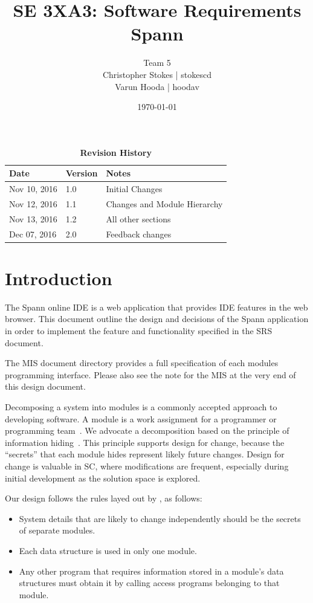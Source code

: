 \documentclass[12pt, titlepage]{article}
\title{SE 3XA3: Software Requirements\\Spann}
\author{Team 5
		\\ Christopher Stokes | stokescd
		\\ Varun Hooda | hoodav
}
\date{\today}
\begin{document}
\maketitle

\tableofcontents
\listoftables
\listoffigures

\begin{table}[bp]
\caption{\bf Revision History}
\begin{tabularx}{\textwidth}{p{3cm}p{2cm}X}
\toprule {\bf Date} & {\bf Version} & {\bf Notes}\\
\midrule
  Nov 10, 2016 & 1.0 & Initial Changes\\
  Nov 12, 2016 & 1.1 & Changes and Module Hierarchy\\
  Nov 13, 2016 & 1.2 & All other sections\\
  Dec 07, 2016 & 2.0 & Feedback changes\\
\bottomrule
\end{tabularx}
\end{table}

\newpage


\section{Introduction}

The Spann online IDE is a web application that provides IDE features in the web
browser. This document outline the design and decisions of the Spann
application in order to implement the feature and functionality specified in the SRS document.

The MIS document directory provides a full specification of each modules
programming interface. Please also see the note for the MIS at the very end of
this design document.

Decomposing a system into modules is a commonly accepted approach to developing
software.  A module is a work assignment for a programmer or programming
team~\citep{ParnasEtAl1984}.  We advocate a decomposition
based on the principle of information hiding~\citep{Parnas1972a}.  This
principle supports design for change, because the ``secrets'' that each module
hides represent likely future changes.  Design for change is valuable in SC,
where modifications are frequent, especially during initial development as the
solution space is explored.

Our design follows the rules layed out by \citet{ParnasEtAl1984}, as follows:
\begin{itemize}
\item System details that are likely to change independently should be the
  secrets of separate modules.
\item Each data structure is used in only one module.
\item Any other program that requires information stored in a module's data
  structures must obtain it by calling access programs belonging to that module.
\end{itemize}
\end{document}
